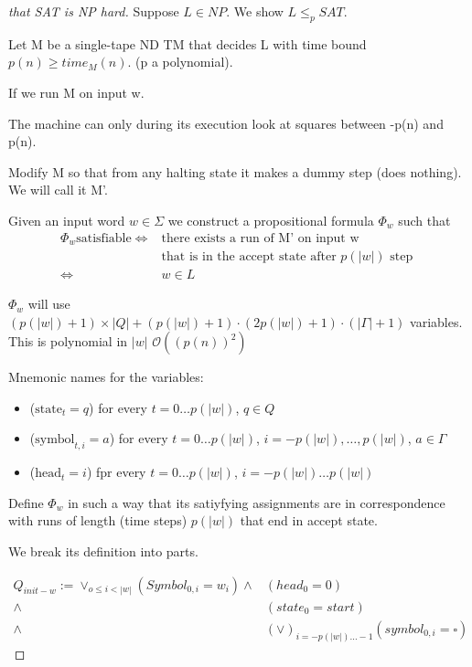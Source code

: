 \documentclass[a4paper,12pt]{article}
\theoremstyle{definition}
\theoremstyle{remark}
\begin{document}
\begin{proof}[that SAT is NP hard]
    Suppose $L \in NP$. We show $L \leq_p SAT$.

    Let M be a single-tape ND TM that decides L with time bound $p(n) \geq time_M(n)$. (p a polynomial).

    If we run M on input w.

    The machine can only during its execution look at squares between -p(n) and p(n).

    Modify M so that from any halting state it makes a dummy step (does nothing). We will call it M'.

    Given an input word $w \in \Sigma$ we construct a propositional formula $\Phi_w$ such that
    \begin{align*}
        \Phi_w  \text{satisfiable} \iff& \text{there exists a run of M' on input w} \\
                                       &\text{that is in the accept state after } p(|w|) \text{ step } \\
                                   \iff& w \in L
    \end{align*}

    $\Phi_w$ will use $(p(|w|) + 1) \times |Q| + (p(|w|) + 1) \cdot (2p(|w|) +1) \cdot (|\Gamma| + 1)$ variables. This
    is polynomial in $|w|$ $\mathscr{O}((p(n))^2)$

    Mnemonic names for the variables:
    \begin{itemize}
        \item ($\text{state}_t = q$) for every $t = 0 \dots p(|w|)$, $q \in Q$
        \item ($\text{symbol}_{t, i} = a$) for every $t = 0 \dots p(|w|)$, $i = -p(|w|), \dots, p(|w|)$, $a \in \Gamma$
        \item ($\text{head}_t = i$) fpr every $t = 0 \dots p(|w|)$, $i = -p(|w|) \dots p(|w|)$ 
    \end{itemize}

    Define $\Phi_w$ in such a way that its satiyfying assignments are in correspondence with runs of length
    (time steps) $p(|w|)$ that end in accept state.

    We break its definition into parts.

    \begin{align*}
        Q_{init-w} := \vee_{o \leq i < |w|} (Symbol_{0, i} = w_i) \land& (head_0 = 0) \\
                                                                  \land& (state_0 = start) \\
                                                                  \land& (\vee)_{i = -p(|w|) \dots -1} (symbol_{0, i} = \square)
    \end{align*}
\end{proof}
\end{document}
